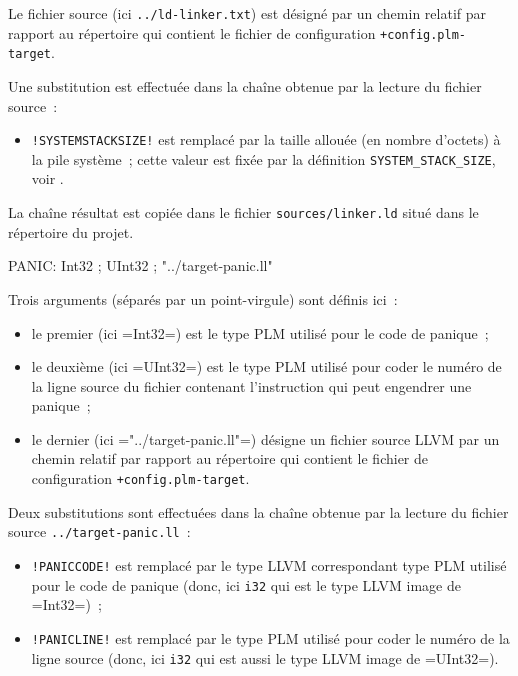 Le fichier source (ici \texttt{../ld-linker.txt}) est désigné par un chemin relatif par rapport au répertoire qui contient le fichier de configuration \texttt{+config.plm-target}.

Une substitution est effectuée dans la chaîne obtenue par la lecture du fichier source~:
\begin{itemize}
  \item \texttt{!SYSTEMSTACKSIZE!} est remplacé par la taille allouée (en nombre d'octets) à la pile système~; cette valeur est fixée par la définition \texttt{SYSTEM\_STACK\_SIZE}, voir .
\end{itemize}

La chaîne résultat est copiée dans le fichier \texttt{sources/linker.ld} situé dans le répertoire du projet.












\begin{PLM}
PANIC:
  Int32 ; UInt32 ; "../target-panic.ll"
\end{PLM}

Trois arguments (séparés par un point-virgule) sont définis ici~:
\begin{itemize}
  \item le premier (ici \plm=Int32=) est le type PLM utilisé pour le code de panique~;
  \item le deuxième (ici \plm=UInt32=) est le type PLM utilisé pour coder le numéro de la ligne source du fichier contenant l'instruction qui peut engendrer une panique~;
  \item le dernier (ici \plm="../target-panic.ll"=) désigne un fichier source LLVM par un chemin relatif par rapport au répertoire qui contient le fichier de configuration \texttt{+config.plm-target}.
\end{itemize}

Deux substitutions sont effectuées dans la chaîne obtenue par la lecture du fichier source \texttt{../target-panic.ll}~:
\begin{itemize}
  \item \texttt{!PANICCODE!} est remplacé par le type LLVM correspondant type PLM utilisé pour le code de panique (donc, ici \texttt{i32} qui est le type LLVM image de \plm=Int32=)~;
  \item \texttt{!PANICLINE!} est remplacé par le type PLM utilisé pour coder le numéro de la ligne source  (donc, ici \texttt{i32} qui est aussi le type LLVM image de \plm=UInt32=).
\end{itemize}


